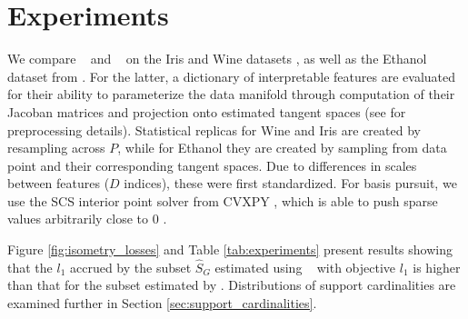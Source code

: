 \section{Experiments}
\label{sec:experiments}

We compare \tsip~ and \greedy~ on the Iris and Wine datasets \citep{misc_iris_53, misc_wine_109, scikit-learn}, as well as the Ethanol dataset from \citet{Chmiela2018-at, Koelle2022-ju}.
For the latter, a dictionary of interpretable features are evaluated for their ability to parameterize the data manifold through computation of their Jacoban matrices and projection onto estimated tangent spaces (see \citet{Koelle2022-ju} for preprocessing details).
Statistical replicas for Wine and Iris are created by resampling across $P$, while for Ethanol they are created by sampling from data point and their corresponding tangent spaces.
Due to differences in scales between features ($D$ indices), these were first standardized.
For basis pursuit, we use the SCS interior point solver \citep{ocpb:16} from CVXPY \citep{diamond2016cvxpy, agrawal2018rewriting}, which is able to push sparse values arbitrarily close to 0 \citep{cvxpy_sparse_solution}.

Figure \ref{fig:isometry_losses} and Table \ref{tab:experiments} present results showing that the $l_1$ accrued by the subset $\widehat S_{G}$ estimated using \greedy~ with objective $l_1$ is higher than that for the subset estimated by \tsip.
Distributions of support cardinalities are examined further in Section \ref{sec:support_cardinalities}.

